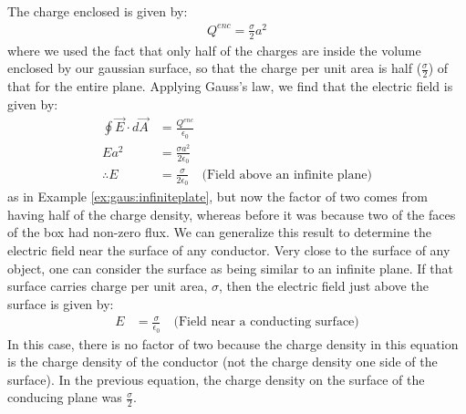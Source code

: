 The charge enclosed is given by:
\begin{align*}
Q^{enc}=\frac{\sigma}{2}a^2
\end{align*}
where we used the fact that only half of the charges are inside the volume enclosed by our gaussian surface, so that the charge per unit area is half ($\frac{\sigma}{2}$) of that for the entire plane. Applying Gauss's law, we find that the electric field is given by:
\begin{align*}
\oint \vec E\cdot d\vec A&=\frac{Q^{enc}}{\epsilon_0} \\
Ea^2&= \frac{\sigma a^2}{2\epsilon_0}\\
\therefore E&= \frac{\sigma}{2\epsilon_0}\quad \text{(Field above an infinite plane)}
\end{align*}
as in Example \ref{ex:gaus:infiniteplate}, but now the factor of two comes from having half of the charge density, whereas before it was because two of the faces of the box had non-zero flux. We can generalize this result to determine the electric field near the surface of any conductor. Very close to the surface of any object, one can consider the surface as being similar to an infinite plane. If that surface carries charge per unit area, $\sigma$, then the electric field just above the surface is given by:
\begin{align*}
 E&= \frac{\sigma}{\epsilon_0} \quad \text{(Field near a conducting surface)}
\end{align*}
In this case, there is no factor of two because the charge density in this equation is the charge density of the conductor (not the charge density one side of the surface). In the previous equation, the charge density on the surface of the conducing plane was $\frac{\sigma}{2}$.


